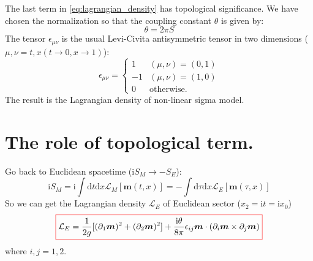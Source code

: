 The last term in \cref{eq:lagrangian_density} has topological significance. 
We have chosen the normalization so that the coupling constant $\theta$ is given by:
\begin{equation}
\theta = 2 \pi S
\end{equation}
The tensor $\epsilon_{\mu\nu}$ is the usual Levi-Civita antisymmetric tensor in two dimensions 
($\mu,\nu=t,x(t \to 0, x \to 1)$):
\begin{equation}
\epsilon_{\mu\nu} = \begin{cases}
1 & (\mu,\nu) = (0,1) \\
-1 & (\mu,\nu) = (1,0) \\
0 & \text{otherwise}.
\end{cases}
\end{equation}
The result is the Lagrangian density of non-linear sigma model.

\section{The role of topological term.}

Go back to Euclidean spacetime ($\mathrm{i} S_M \to -S_E$):
\begin{equation}
\mathrm{i} S_M = \mathrm{i} \int \mathrm{d}t \mathrm{d}x \mathcal{L}_M [\bm{m}(t,x)] 
= - \int \mathrm{d}\tau \mathrm{d}x \mathcal{L}_E [\bm{m}(\tau,x)]
\end{equation}
So we can get the Lagrangian density $\mathcal{L}_E$ of Euclidean sector ($x_2 = \mathrm{i}t = \mathrm{i}x_0$)
\begin{equation}
    \colorboxed{
    \mathcal{L}_E = \frac{1}{2g} [(\partial_1 \bm{m})^2 + (\partial_2 \bm{m})^2] + 
    \frac{\mathrm{i}\theta}{8\pi} \epsilon_{ij} \bm{m} \cdot (\partial_i \bm{m} \times \partial_j \bm{m})
    }
\end{equation}
where $i,j = 1,2$.

